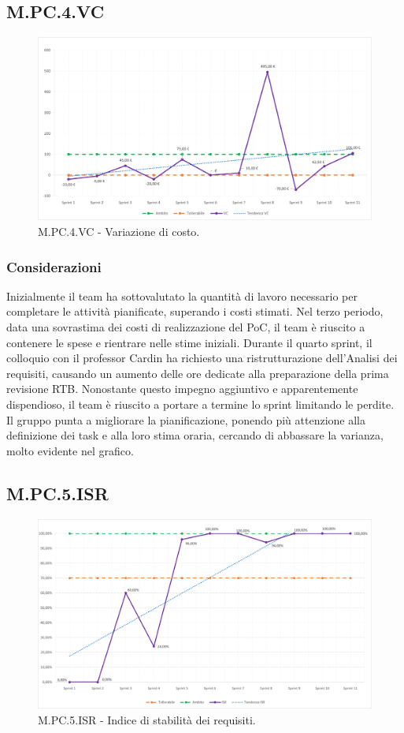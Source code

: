 \documentclass[10pt, a4paper]{article}
\begin{document}
\subsection{M.PC.4.VC}
\begin{figure}[H]
\includegraphics[width=15.5cm]{img/metriche/MPC4VC.png}
\caption{M.PC.4.VC - Variazione di costo.}
\end{figure}
\subsubsection{Considerazioni}
Inizialmente il team ha sottovalutato la quantità di lavoro necessario per completare le attività pianificate, superando i costi stimati.
Nel terzo periodo, data una sovrastima dei costi di realizzazione del PoC, il team è riuscito a contenere le spese e rientrare nelle stime iniziali.
Durante il quarto sprint, il colloquio con il professor Cardin ha richiesto una ristrutturazione dell'Analisi dei requisiti, causando un aumento delle ore dedicate alla preparazione della prima revisione RTB.
Nonostante questo impegno aggiuntivo e apparentemente dispendioso, il team è riuscito a portare a termine lo sprint limitando le perdite.
Il gruppo punta a migliorare la pianificazione, ponendo più attenzione alla definizione dei task e alla loro stima oraria, cercando di abbassare la varianza, molto evidente nel grafico. 
\subsection{M.PC.5.ISR}
\begin{figure}[H]
\includegraphics[width=15.5cm]{img/metriche/MPC5ISR.png}
\caption{M.PC.5.ISR - Indice di stabilità dei requisiti.}
\end{figure}
\end{document}
